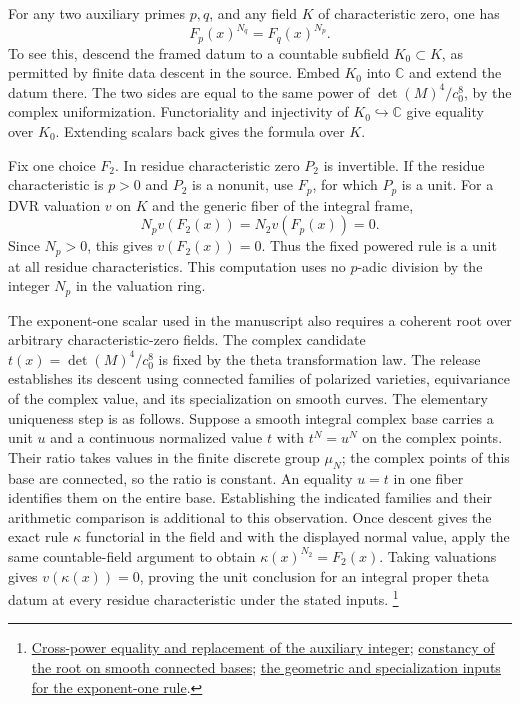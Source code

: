 For any two auxiliary primes \(p,q\), and any field \(K\) of
characteristic zero, one has
\[
                         F_p(x)^{N_q}=F_q(x)^{N_p}.
\]
To see this, descend the framed datum to a countable subfield
\(K_0\subset K\), as permitted by finite data descent in the
source. Embed \(K_0\) into \(\mathbb C\) and extend the datum
there. The two sides are equal to the same power of
\(\det(M)^4/c_0^8\), by the complex uniformization. Functoriality
and injectivity of \(K_0\hookrightarrow\mathbb C\) give equality
over \(K_0\). Extending scalars back gives the formula over \(K\).

Fix one choice \(F_2\). In residue characteristic zero \(P_2\)
is invertible. If the residue characteristic is \(p>0\) and
\(P_2\) is a nonunit, use \(F_p\), for which \(P_p\) is a unit.
For a DVR valuation \(v\) on \(K\) and the generic fiber of the
integral frame,
\[
           N_p v(F_2(x))=N_2 v(F_p(x))=0 .
\]
Since \(N_p>0\), this gives \(v(F_2(x))=0\).
Thus the fixed powered rule is a unit at all residue
characteristics. This computation uses no \(p\)-adic division by
the integer \(N_p\) in the valuation ring.

The exponent-one scalar used in the manuscript also requires
a coherent root over arbitrary characteristic-zero fields.
The complex candidate \(t(x)=\det(M)^4/c_0^8\) is fixed by the
theta transformation law. The release establishes its descent
using connected families of polarized varieties, equivariance of
the complex value, and its specialization on smooth curves. The
elementary uniqueness step is as follows. Suppose a smooth
integral complex base carries a unit \(u\) and a continuous
normalized value \(t\) with \(t^N=u^N\) on the complex points.
Their ratio takes values in the finite discrete group \(\mu_N\);
the complex points of this base are connected, so the ratio is
constant. An equality \(u=t\) in one fiber identifies them on
the entire base. Establishing the indicated families and their
arithmetic comparison is additional to this observation.
Once descent gives the exact rule \(\kappa\) functorial in the
field and with the displayed normal value, apply the same
countable-field argument to obtain
\(\kappa(x)^{N_2}=F_2(x)\). Taking valuations gives
\(v(\kappa(x))=0\), proving the unit conclusion for an integral
proper theta datum at every residue characteristic under the
stated inputs.
\footnote{\href{https://github.com/ChristianKudeba/alpoge-rh-verification/blob/alpoge-source-7cbf7a0c/src/Development/AbelianVarietyTheory/Proofs/ThetaLawProofs/ThetaKeyRuleExistsOfAlgebraicInvariants.lean}{Cross-power equality and replacement of the auxiliary integer};
\href{https://github.com/ChristianKudeba/alpoge-rh-verification/blob/alpoge-source-7cbf7a0c/src/Development/AbelianVarietyTheory/Proofs/ThetaLawProofs/ThetaFrameValueEqUnitSmoothConnectedBase.lean}{constancy of the root on smooth connected bases};
\href{https://github.com/ChristianKudeba/alpoge-rh-verification/blob/alpoge-source-7cbf7a0c/src/Development/AbelianVarietyTheory/Proofs/UniformizationProofs/KeyFormulaOfConnFam.lean}{the geometric and specialization inputs for the exponent-one rule}.}
